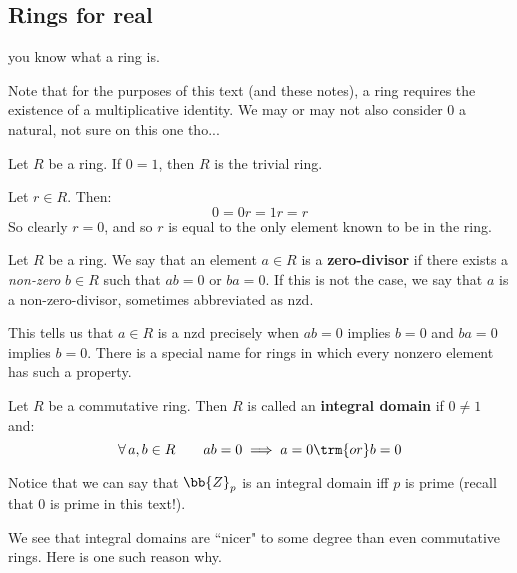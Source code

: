 \documentclass{article}
\begin{document}
\newpage
\subsection{Rings for real}

\begin{defn}
    you know what a ring is.
\end{defn}

Note that for the purposes of this text (and these notes),
a ring requires the existence of a multiplicative identity.
We may or may not also consider $ 0 $ a natural, not sure on this one tho...

\begin{lm}
    Let $ R $ be a ring. If $ 0 = 1 $, then $ R $ is the trivial ring.
\end{lm}

\begin{pf}
    Let $ r \in R $. Then:
    \begin{equation*}
        0 = 0r = 1r = r
    \end{equation*}
    So clearly $ r = 0 $, and so $ r $ is equal to the only element known to be in the ring.
\end{pf}

\begin{defn}
    Let $ R $ be a ring. \vsp
    We say that an element $ a \in R $ is a \textbf{zero-divisor} if
    there exists a \textit{non-zero} $ b \in R $ such that $ ab = 0 $ or $ ba = 0 $. \vsp
    If this is not the case, we say that $ a $ is a non-zero-divisor,
    sometimes abbreviated as nzd.
\end{defn}

This tells us that $ a \in R $ is a nzd precisely when $ ab = 0 $ implies $ b = 0 $ and $ ba = 0 $
implies $ b = 0 $. There is a special name for rings in which every nonzero element has such a
property.

\begin{defn}
    Let $ R $ be a commutative ring. Then $ R $ is called an \textbf{integral domain}
    if $ 0 \neq 1 $ and:
    \begin{equation*}
        \forall \, a, b \in R \qquad ab = 0 \implies a = 0 \trm{ or } b = 0
    \end{equation*}
\end{defn}

Notice that we can say that $ \bb{Z}_{p} $ is an integral domain iff $ p $ is prime
(recall that $ 0 $ is prime in this text!).

We see that integral domains are ``nicer" to some degree than even commutative rings.
Here is one such reason why.
\end{document}
